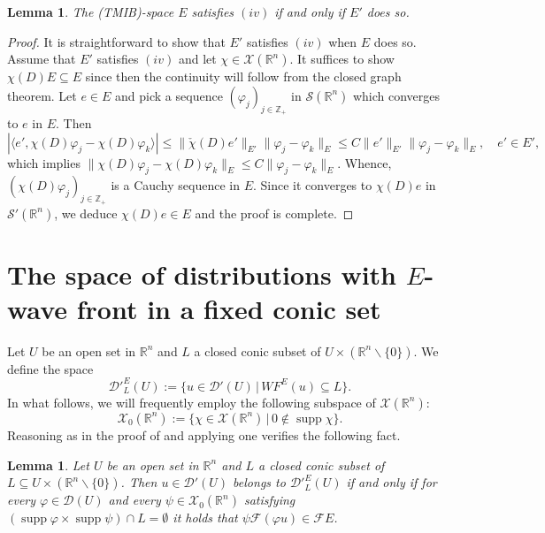 \documentclass[12pt,reqno]{amsart}
\newcommand{\RR}{\mathbb R}
\newcommand{\ZZ}{\mathbb Z}
\newcommand{\DD}{\mathcal D}
\newcommand{\SSS}{\mathcal S}
\newcommand{\XX}{\mathcal X}
\newcommand{\supp}{\operatorname{supp}}
\theoremstyle{plain}
\newtheorem{lemma}[theorem]{Lemma}
\theoremstyle{remark}
\theoremstyle{definition}
\numberwithin{equation}{section}
\begin{document}
\begin{lemma}\label{lem-for-tmbsjk}
The (TMIB)-space $E$ satisfies $(iv)$ if and only if $E'$ does so.
\end{lemma}

\begin{proof}
It is straightforward to show that $E'$ satisfies $(iv)$ when $E$ does so. Assume that $E'$ satisfies $(iv)$ and let $\chi\in\XX(\RR^n)$. It suffices to show $\chi(D)E\subseteq E$ since then the continuity will follow from the closed graph theorem. Let $e\in E$ and pick a sequence $(\varphi_j)_{j\in\ZZ_+}$ in $\SSS(\RR^n)$ which converges to $e$ in $E$. Then
\begin{equation*}
|\langle e',\chi(D)\varphi_j-\chi(D)\varphi_k\rangle|\leq \|\check{\chi}(D)e'\|_{E'}\|\varphi_j-\varphi_k\|_E\leq C\|e'\|_{E'}\|\varphi_j-\varphi_k\|_E,
\quad e'\in E',
\end{equation*}
which implies $\|\chi(D)\varphi_j-\chi(D)\varphi_k\|_E\leq C\|\varphi_j-\varphi_k\|_E$. Whence, $(\chi(D)\varphi_j)_{j\in\ZZ_+}$ is a Cauchy sequence in $E$. Since it converges to $\chi(D)e$ in $\SSS'(\RR^n)$, we deduce $\chi(D)e\in E$ and the proof is complete.
\end{proof}



\section{The space of distributions with $E$-wave front in a fixed conic set}\label{Sec1}


Let $U$ be an open set in $\RR^n$ and $L$ a closed conic subset of $U\times(\RR^n\backslash\{0\})$. We define the space
\begin{equation*}
\DD'^E_L(U):=\{u\in\DD'(U)\,|\, WF^E(u)\subseteq L\}.
\end{equation*}
In what follows, we will frequently employ the following subspace of $\XX(\RR^n)$:
\begin{equation*}
\XX_0(\RR^n):=\{\chi\in\XX(\RR^n)\,|\, 0\notin\supp\chi\}.
\end{equation*}
Reasoning as in the proof of \cite[Lemma 8.2.1, p. 262]{hor} and applying \cite[Proposition 3.6]{DPP} one verifies the following fact.

\begin{lemma}\label{lem-for-semwelds}
Let $U$ be an open set in $\RR^n$ and $L$ a closed conic subset of $L\subseteq U\times (\RR^n\backslash\{0\})$. Then $u\in\DD'(U)$ belongs to $\DD'^E_L(U)$ if and only if for every $\varphi\in\DD(U)$ and every $\psi\in\XX_0(\RR^n)$ satisfying $(\supp\varphi\times\supp\psi)\cap L=\emptyset$ it holds that $\psi\mathcal{F}(\varphi u)\in \mathcal{F}E$.
\end{lemma}
\end{document}
